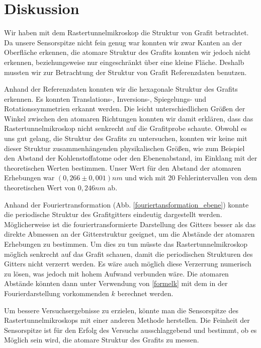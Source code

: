 \documentclass[10pt,a4paper]{article}
\begin{document}
\section{Diskussion}

Wir haben mit dem Rastertunnelmikroskop die Struktur von Grafit betrachtet. Da unsere Sensorspitze nicht fein genug war konnten wir zwar Kanten an der Oberfläche erkennen, die atomare Struktur des Grafits konnten wir jedoch nicht erkennen, beziehungsweise nur eingeschränkt über eine kleine Fläche. Deshalb mussten wir zur Betrachtung der Struktur von Grafit Referenzdaten benutzen.

Anhand der Referenzdaten konnten wir die hexagonale Struktur des Grafits erkennen. Es konnten Translations-, Inversions-, Spiegelungs- und Rotationssymmetrien erkannt werden. Die leicht unterschiedlichen Größen der Winkel zwischen den atomaren Richtungen konnten wir damit erklären, dass das Rastertunnelmikroskop nicht senkrecht auf die Grafitprobe schaute. Obwohl es uns gut gelang, die Struktur des Grafits zu untersuchen, konnten wir keine mit dieser Struktur zusammenhängenden physikalischen Größen, wie zum Beispiel den Abstand der Kohlenstoffatome oder den Ebenenabstand, im Einklang mit der theoretischen Werten bestimmen. Unser Wert für den Abstand der atomaren Erhebungen war $(0,266 \pm 0,001) nm$ und wich mit 20 Fehlerintervallen von dem theoretischen Wert von $0,246 nm$ ab.

Anhand der Fouriertransformation (Abb. \ref{fouriertansformation_ebene}) konnte die periodische Struktur des Grafitgitters eindeutig dargestellt werden. Möglicherweise ist die fouriertransformierte Darstellung des Gitters besser als das direkte Abmessen an der Gitterstruktur geeignet, um die Abstände der atomaren Erhebungen zu bestimmen. Um dies zu tun müsste das Rastertunnelmikroskop möglich senkrecht auf das Grafit schauen, damit die periodischen Strukturen des Gitters nicht verzerrt werden. Es wäre auch möglich diese Verzerrung numerisch zu lösen, was jedoch mit hohem Aufwand verbunden wäre. Die atomaren Abstände könnten dann unter Verwendung von \ref{formelk} mit dem in der Fourierdarstellung vorkommenden $k$ berechnet werden.

Um bessere Versuchsergebnisse zu erzielen, könnte man die Sensorspitze des Rastertunnelmikroskops mit einer anderen Methode herstellen. Die Feinheit der Sensorspitze ist für den Erfolg des Versuchs ausschlaggebend und bestimmt, ob es Möglich sein wird, die atomare Struktur des Grafits zu messen.
\end{document}
